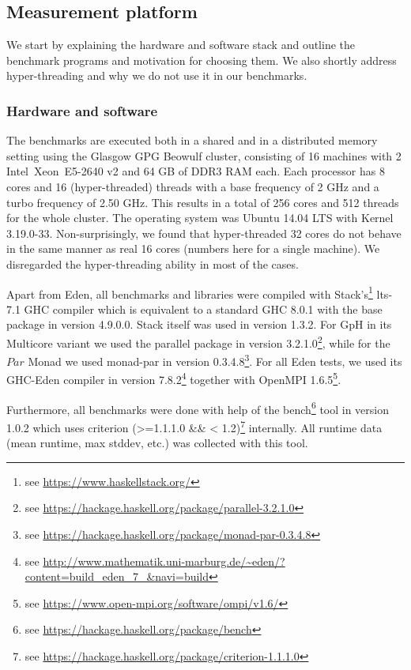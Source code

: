 \documentclass{jfp1}
\newcommand{\Conid}[1]{\mathit{#1}}
\begin{document}
\subsection{Measurement platform}
We start by explaining the hardware and software stack and outline the benchmark programs and motivation for choosing them. We also shortly address hyper-threading and why we do not use it in our benchmarks.

\subsubsection{Hardware and software}

The benchmarks are executed  both in a shared and in a distributed memory setting using the Glasgow GPG Beowulf cluster, consisting of
16 machines with 2 Intel\SymbReg~Xeon\SymbReg~E5-2640 v2 and 64 GB of DDR3 RAM each. Each processor has 8 cores and 16 (hyper-threaded) threads with a base frequency of 2 GHz and a turbo frequency of 2.50 GHz. This results in a total of 256 cores and 512 threads for the whole cluster. The operating system was Ubuntu 14.04 LTS with Kernel 3.19.0-33. Non-surprisingly, we found that hyper-threaded 32 cores do not behave in the same manner as real 16 cores (numbers here for a single machine). We disregarded the hyper-threading ability in most of the cases.

Apart from Eden, all benchmarks and libraries were compiled with Stack's\footnote{see \url{https://www.haskellstack.org/}} lts-7.1 GHC compiler which is equivalent to a standard GHC 8.0.1 with the base package in version 4.9.0.0. Stack itself was used in version 1.3.2. For GpH in its Multicore variant we used the parallel package in version 3.2.1.0\footnote{see \url{https://hackage.haskell.org/package/parallel-3.2.1.0}}, while for the \ensuremath{\Conid{Par}} Monad we used monad-par in version 0.3.4.8\footnote{see \url{https://hackage.haskell.org/package/monad-par-0.3.4.8}}. For all Eden tests, we used its GHC-Eden compiler in version 7.8.2\footnote{see \url{http://www.mathematik.uni-marburg.de/~eden/?content=build_eden_7_&navi=build}} together with OpenMPI 1.6.5\footnote{see \url{https://www.open-mpi.org/software/ompi/v1.6/}}.

Furthermore, all benchmarks were done with help of the bench\footnote{see \url{https://hackage.haskell.org/package/bench}} tool in version 1.0.2 which uses criterion (>=1.1.1.0 \&\& < 1.2)\footnote{see \url{https://hackage.haskell.org/package/criterion-1.1.1.0}} internally. All runtime data (mean runtime, max stddev, etc.) was collected with this tool.
\end{document}
